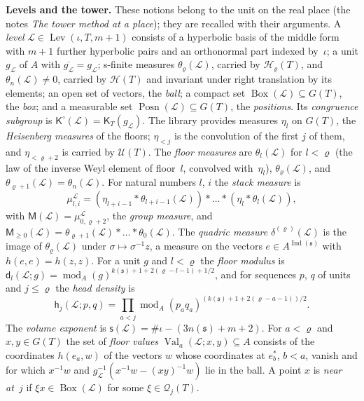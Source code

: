 \documentclass[11pt,a4paper]{article}
\newcommand{\m}[1]{\mbox{$#1$}}        %
\newcommand{\subhead}[1]{\par\addvspace{9pt plus 2pt}\Needspace{4\baselineskip}\noindent\textbf{#1}\enspace\ignorespaces}
\theoremstyle{plainx}
\theoremstyle{uprightx}
\newcommand{\fs}{\mathfrak{s}}                      %
\newcommand{\cL}{\mathcal{L}}                       %
\newcommand{\kk}[1]{k(#1)}                          %
\newcommand{\nn}[1]{n(#1)}                          %
\newcommand{\Ix}[1]{\operatorname{Ind}(#1)}                          %
\newcommand{\GT}[1]{G(#1)}                          %
\newcommand{\UT}[1]{\mathcal{U}(#1)}                %
\newcommand{\HT}[1]{\mathcal{H}(#1)}                %
\newcommand{\Hl}[2]{\mathcal{H}_{#1}(#2)}           %
\newcommand{\Ql}[2]{\mathcal{Q}_{#1}(#2)}           %
\newcommand{\modA}{\operatorname{mod}_A}            %
\newcommand{\uLev}[2]{\mathsf{K}_{#2}(#1)}                   %
\newcommand{\cgp}[1]{\mathsf{K}^{\circ}(#1)}        %
\newcommand{\gL}[1]{g_{#1}}                         %
\newcommand{\BoxL}[1]{\operatorname{Box}(#1)}       %
\newcommand{\Posn}[1]{\operatorname{Posn}(#1)}      %
\newcommand{\Levels}[3]{\operatorname{Lev}(#1,#2,#3)} %
\newcommand{\gM}[1]{\mathsf{M}(#1)}                 %
\newcommand{\gMu}[1]{\mathsf{M}_{\ge0}(#1)}         %
\newcommand{\flm}[2]{\theta_{#2}(#1)}               %
\newcommand{\mH}[1]{\theta_{n}(#1)}                 %
\newcommand{\stk}[3]{\mu^{#1}_{#2,#3}}              %
\newcommand{\quadric}[2]{\delta^{(#2)}(#1)}         %
\newcommand{\etab}[1]{\eta_{<#1}}                   %
\newcommand{\fmod}[3]{\mathsf{d}_{#2}(#1;#3)}       %
\newcommand{\vexp}[1]{\mathsf{s}(#1)}               %
\newcommand{\Val}[4]{\operatorname{Val}_{#2}(#1;#3,#4)} %
\newcommand{\hdens}[4]{\mathsf{h}_{#2}(#1;#3,#4)}   %
\begin{document}
\subhead{Levels and the tower.} These notions belong to the unit on the real place (the notes \emph{The tower
method at a place}); they are recalled with their arguments. A \emph{level}
\m{\cL\in\Levels{\iota}{T}{m+1}} consists of a hyperbolic basis of the middle form with \m{m+1} further
hyperbolic pairs and an orthonormal part indexed by~$\iota$; a unit \m{\gL{\cL}} of $A$ with
\m{\overline{\gL{\cL}}=\gL{\cL}}; s-finite measures \m{\flm{\cL}{\varrho}}, carried by \m{\Hl{\varrho}{T}}, and
\m{\mH{\cL}\ne0}, carried by \m{\HT{T}} and invariant under right translation by its elements; an open set of vectors,
the \emph{ball}; a compact set \m{\BoxL{\cL}\subseteq\GT{T}}, the \emph{box}; and a measurable set
\m{\Posn{\cL}\subseteq\GT{T}}, the \emph{positions}. Its \emph{congruence subgroup} is
\m{\cgp{\cL}=\uLev{\gL{\cL}}{T}}. The library provides measures $\eta_l$ on \m{\GT{T}}, the \emph{Heisenberg
measures} of the floors; \m{\etab{j}} is the convolution of the first $j$ of them, and \m{\etab{\varrho+2}} is
carried by \m{\UT{T}}. The \emph{floor measures} are \m{\flm{\cL}{l}} for \m{l<\varrho} (the law of the inverse
Weyl element of floor~$l$, convolved with~$\eta_l$), \m{\flm{\cL}{\varrho}}, and \m{\flm{\cL}{\varrho+1}=\mH{\cL}}.
For natural numbers $l$, $i$ the \emph{stack measure} is
\[\stk{\cL}{l}{i}=(\eta_{l+i-1}*\flm{\cL}{l+i-1})*\dots*(\eta_l*\flm{\cL}{l}),\]
with \m{\gM{\cL}=\stk{\cL}{0}{\varrho+2}}, the \emph{group measure}, and
\m{\gMu{\cL}=\flm{\cL}{\varrho+1}*\dots*\flm{\cL}{0}}. The \emph{quadric measure} \m{\quadric{\cL}{\varrho}} is the
image of \m{\flm{\cL}{\varrho}} under \m{\sigma\mapsto\sigma^{-1}z}, a measure on the vectors \m{e\in A^{\Ix{\fs}}} with
\m{h(e,e)=h(z,z)}. For a unit $g$ and \m{l<\varrho} the \emph{floor modulus} is
\m{\fmod{\cL}{l}{g}=\modA(g)^{\kk{\fs}+1+2(\varrho-l-1)+1/2}}, and for sequences $p$, $q$ of units and
\m{j\le\varrho} the \emph{head density} is
\[\hdens{\cL}{j}{p}{q}=\prod_{a<j}\modA(p_aq_a)^{(\kk{\fs}+1+2(\varrho-a-1))/2}.\]
The \emph{volume exponent} is \m{\vexp{\cL}=\#\iota-(3\nn{\fs}+m+2)}. For \m{a<\varrho} and \m{x,y\in\GT{T}} the set of
\emph{floor values} \m{\Val{\cL}{a}{x}{y}\subseteq A} consists of the coordinates \m{h(e_a,w)} of the vectors $w$
whose coordinates at $e^*_b$, \m{b<a}, vanish and for which \m{x^{-1}w} and
\m{\gL{\cL}^{-1}(x^{-1}w-(xy)^{-1}w)} lie in the ball. A point $x$ is \emph{near at~$j$} if \m{\xi x\in\BoxL{\cL}}
for some \m{\xi\in\Ql{j}{T}}.
\end{document}
